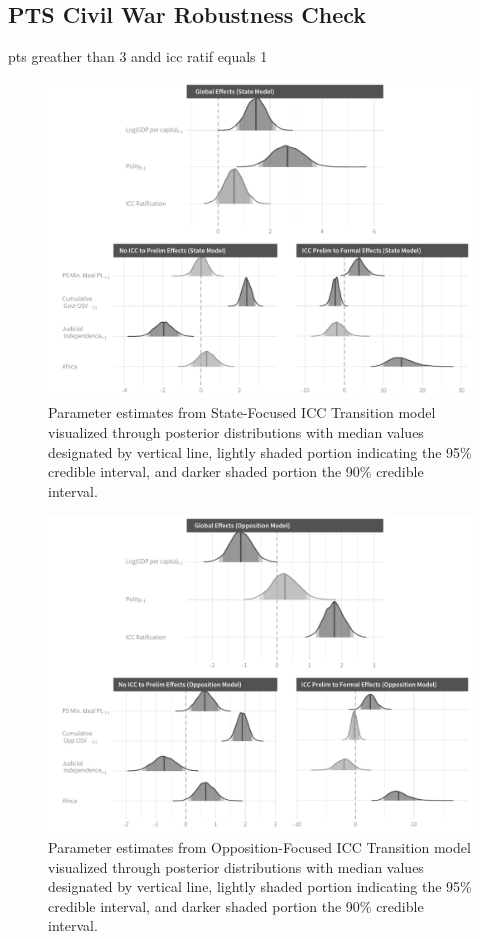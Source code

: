 \subsection*{PTS Civil War Robustness Check}

pts greather than 3 andd icc ratif equals 1

\begin{figure}
    \centering
    \includegraphics[width=1\textwidth]{stateCoefSumm_ptsCivilWarOnly.pdf}
    \caption{Parameter estimates from State-Focused ICC Transition model visualized through posterior distributions with median values designated by vertical line, lightly shaded portion indicating the 95\% credible interval, and darker shaded portion the 90\% credible interval.}
    \label{fig:stateModel}
\end{figure}

\begin{figure}
    \centering
    \includegraphics[width=1\textwidth]{rebelCoefSumm_ptsCivilWarOnly.pdf}
    \caption{Parameter estimates from Opposition-Focused ICC Transition model visualized through posterior distributions with median values designated by vertical line, lightly shaded portion indicating the 95\% credible interval, and darker shaded portion the 90\% credible interval.}
    \label{fig:rebelModel}
\end{figure}

